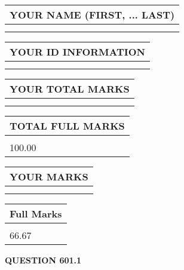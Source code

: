 \documentclass{ctexart}
\begin{document}
   
   
   
\newpage 
\setcounter{page}{ 
   601001 } 
   
   
   
   
\noindent\begin{tabular}{|l|}
\hline
YOUR NAME (FIRST, ... LAST)  \\
\hline
 \\ 
 \\ 
\hline
\end{tabular}
\hspace{0.05in} \begin{tabular}{|l|}
\hline
 YOUR   ID   INFORMATION  \\
\hline
 \\ 
 \\ 
\hline
\end{tabular}
   
   
\vspace{0.2in}\noindent\begin{tabular}{|l|}
\hline
YOUR TOTAL MARKS  \\
\hline
 \\ 
 \\ 
\hline
\end{tabular}
\hspace{0.05in} \begin{tabular}{|l|}
\hline
TOTAL FULL MARKS  \\
\hline
 \\ 
100.00 \\
\hline
\end{tabular}
   
   
 \vspace{0.2in}
 
 
 
 
   
   
  
\vspace{0.2in}
  
\noindent\begin{tabular}{|l|}
\hline
 YOUR MARKS  \\
\hline
 \\ 
 \\ 
\hline
\end{tabular}
\hspace{0.05in} \begin{tabular}{|l|}
\hline
 Full Marks  \\
\hline
 \\ 
66.67 \\
\hline
\end{tabular}
{\textbf{\Large{QUESTION
601.1 
}}}
  
\end{document}
